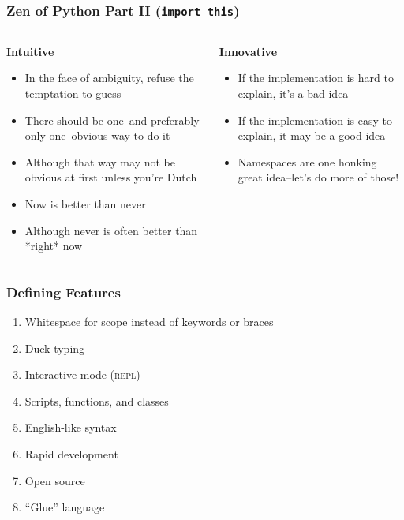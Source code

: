 \documentclass{beamer}
\begin{document}
  \begin{frame}
    \frametitle{Zen of Python Part II (\texttt{import this})}
    \begin{columns}
      \begin{column}{0.60\textwidth}
	\textbf{Intuitive}
        \begin{itemize}
          \item In the face of ambiguity, refuse the temptation to guess
          \item There should be one--and preferably only one--obvious way to do it
	  \item Although that way may not be obvious at first unless you're Dutch
	  \item Now is better than never
          \item Although never is often better than *right* now
        \end{itemize}
      \end{column}
      \begin{column}{0.40\textwidth}
        \textbf{Innovative}
        \begin{itemize}
       	  \item If the implementation is hard to explain, it's a bad idea
	  \item If the implementation is easy to explain, it may be a good idea
	  \item Namespaces are one honking great idea--let's do more of those!
        \end{itemize}
      \end{column}
    \end{columns}
  \end{frame}

  \begin{frame}
    \frametitle{Defining Features}
    \begin{enumerate}
      \item Whitespace for scope instead of keywords or braces
      \item Duck-typing
      \item Interactive mode (\textsc{repl})
      \item Scripts, functions, and classes
      \item English-like syntax
      \item Rapid development
      \item Open source
      \item ``Glue'' language
    \end{enumerate}
  \end{frame}
\end{document}
